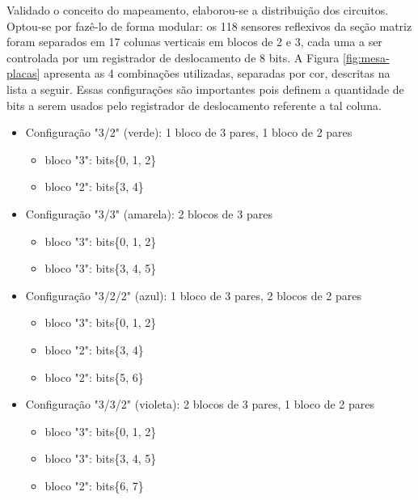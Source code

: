 \documentclass[a4paper,12pt]{article}
\begin{document}
  Validado o conceito do mapeamento, elaborou-se a distribuição dos circuitos. Optou-se por fazê-lo de forma modular: os 118 sensores reflexivos da seção matriz foram separados em 17 colunas verticais em blocos de 2 e 3, cada uma a ser controlada por um registrador de deslocamento de 8 bits. A Figura \ref{fig:mesa-placas} apresenta as 4 combinações utilizadas, separadas por cor, descritas na lista a seguir. Essas configurações são importantes pois definem a quantidade de bits a serem usados pelo registrador de deslocamento referente a tal coluna.
  
  \begin{itemize}
    \item Configuração "3/2" (verde): 1 bloco de 3 pares, 1 bloco de 2 pares
      \begin{itemize}
          \item bloco "3": bits\{0, 1, 2\}
          \item bloco "2": bits\{3, 4\}
      \end{itemize}
    \item Configuração "3/3" (amarela): 2 blocos de 3 pares
      \begin{itemize}
          \item bloco "3": bits\{0, 1, 2\}
          \item bloco "3": bits\{3, 4, 5\}
      \end{itemize}    
    \item Configuração "3/2/2" (azul): 1 bloco de 3 pares, 2 blocos de 2 pares
      \begin{itemize}
          \item bloco "3": bits\{0, 1, 2\}
          \item bloco "2": bits\{3, 4\}
          \item bloco "2": bits\{5, 6\}
      \end{itemize}    
    \item Configuração "3/3/2" (violeta): 2 blocos de 3 pares, 1 bloco de 2 pares
      \begin{itemize}
          \item bloco "3": bits\{0, 1, 2\}
          \item bloco "3": bits\{3, 4, 5\}
          \item bloco "2": bits\{6, 7\}
      \end{itemize}
  \end{itemize}
   
\end{document}
